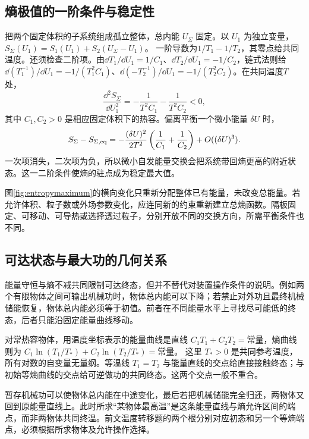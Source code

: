 \subsection{熵极值的一阶条件与稳定性}
\label{th:entropystability}
把两个固定体积的子系统组成孤立整体，总内能 $U_\Sigma$ 固定。以 $U_1$ 为独立变量，
$S_\Sigma(U_1)=S_1(U_1)+S_2(U_\Sigma-U_1)$。
一阶导数为$1/T_1-1/T_2$，其零点给共同温度。还须检查二阶项。由$\dd T_1/\dd U_1=1/C_1$、$\dd T_2/\dd U_1=-1/C_2$，链式法则给$\dd(T_1^{-1})/\dd U_1=-1/(T_1^2C_1)$、$\dd(-T_2^{-1})/\dd U_1=-1/(T_2^2C_2)$。在共同温度$T$处，
\[
 \frac{\dd^2S_\Sigma}{\dd U_1^2}
 =-\frac1{T^2C_1}-\frac1{T^2C_2}<0,
\]
其中 $C_1,C_2>0$ 是相应固定体积下的热容。偏离平衡一个微小能量 $\delta U$ 时，
\[
 S_\Sigma-S_{\Sigma,\rm eq}
 =-\frac{(\delta U)^2}{2T^2}
 \left(\frac1{C_1}+\frac1{C_2}\right)+O((\delta U)^3).
\]
一次项消失，二次项为负，所以微小自发能量交换会把系统带回熵更高的附近状态。这一二阶条件使熵的驻点成为稳定最大值。

图\ref{fig:entropymaximum}的横向变化只重新分配整体已有能量，未改变总能量。若允许体积、粒子数或外场参数变化，应连同新的约束重新建立总熵函数。隔板固定、可移动、可导热或选择透过粒子，分别开放不同的交换方向，所需平衡条件也不同。

\subsection{可达状态与最大功的几何关系}
能量守恒与熵不减共同限制可达终态，但并不替代对装置操作条件的说明。例如两个有限物体之间可输出机械功时，物体总内能可以下降；若禁止对外功且最终机械储能恢复，物体总内能必须等于初值。前者在不同能量水平上寻找尽可能低的终态，后者只能沿固定能量曲线移动。

对常热容物体，用温度坐标表示的能量曲线是直线
$C_1T_1+C_2T_2=\text{常量}$，熵曲线则为
$C_1\ln(T_1/T_\ast)+C_2\ln(T_2/T_\ast)=\text{常量}$。
这里 $T_\ast>0$ 是共同参考温度，所有对数的自变量无量纲。等温线 $T_1=T_2$ 与能量直线的交点给直接接触终态；与初始等熵曲线的交点给可逆做功的共同终态。这两个交点一般不重合。

暂存机械功可以使物体总内能在中途变化，最后若把机械储能完全归还，两物体又回到原能量直线上。此时所求“某物体最高温”是这条能量直线与熵允许区间的端点，而非两物体共同终温。前文温度转移题的两个根分别对应初态和另一个等熵端点，必须根据所求物体及允许操作选择。

